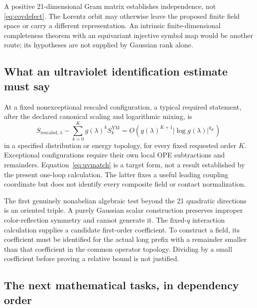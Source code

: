 A positive 21-dimensional Gram matrix establishes independence, not
\eqref{eq:covdefect}. The Lorentz orbit may otherwise leave the proposed
finite field space or carry a different representation. An intrinsic
finite-dimensional completeness theorem with an equivariant injective
symbol map would be another route; its hypotheses are not supplied by
Gaussian rank alone.

\subsection{What an ultraviolet identification estimate must say}

At a fixed nonexceptional rescaled configuration, a typical required
statement, after the declared canonical scaling and logarithmic mixing,
is
\begin{equation}
 S_{\mathrm{rescaled},\lambda}
  -\sum_{k=0}^K g(\lambda)^k S_k^{\mathrm{YM}}
 =O\!\left(g(\lambda)^{K+1}|\log g(\lambda)|^{q_K}\right)
 \label{eq:uvmatch}
\end{equation}
in a specified distribution or energy topology, for every fixed requested
order \(K\). Exceptional configurations require their own local OPE
subtractions and remainders. Equation~\eqref{eq:uvmatch} is a target
form, not a result established by the present one-loop calculation.
The latter fixes a useful leading coupling coordinate but does not
identify every composite field or contact normalization.

The first genuinely nonabelian algebraic test beyond the 21 quadratic
directions is an oriented triple. A purely Gaussian scalar construction
preserves improper color-reflection symmetry and cannot generate it.
The fixed-\(q\) interaction calculation supplies a candidate first-order
coefficient. To construct a field, its coefficient must be identified
for the actual long prefix with a remainder smaller than that coefficient
in the common operator topology. Dividing by a small coefficient before
proving a relative bound is not justified.

\subsection{The next mathematical tasks, in dependency order}

